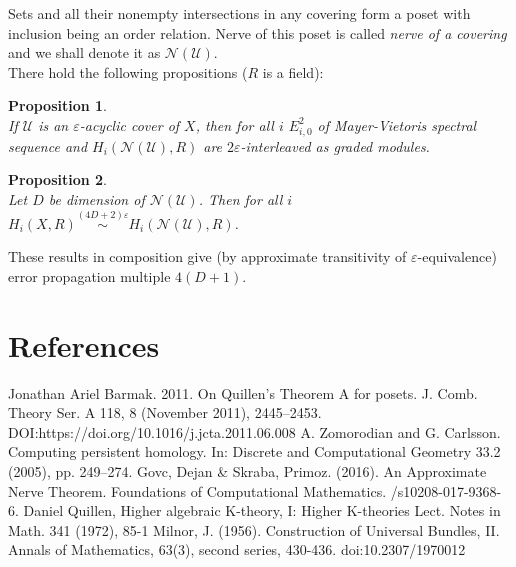 \documentclass[a4paper, 12pt]{article}
\newtheorem{proposition}{Proposition}
\theoremstyle{definition}
\theoremstyle{remark}
\newcommand{\define}[1]{{\textit{#1}}}
\begin{document}
Sets and all their nonempty intersections in any covering form a poset with inclusion being an order relation. Nerve of this poset is called \define{nerve of a covering} and we shall denote it as $\mathcal{N}(\mathcal{U})$.\\

There hold the following propositions ($R$ is a field):

\begin{proposition} {\cite[Corollary 5.2]{GS16}}\\
  If $\mathcal{U}$ is an $\varepsilon$-acyclic cover of $X$, then for all $i$ $E^2_{i,0}$ of Mayer-Vietoris spectral sequence and $H_{i}(\mathcal{N}(\mathcal{U}),R)$ are $2\varepsilon$-interleaved as graded modules.
\end{proposition}

\begin{proposition} {\cite[Theorem 7.1]{GS16}}\\
  Let $D$ be dimension of $\mathcal{N}(\mathcal{U})$. Then for all $i$ $H_i(X,R) \stackrel{(4D+2)\varepsilon}{\sim} H_i(\mathcal{N}(\mathcal{U}),R)$.
\end{proposition}

These results in composition give (by approximate transitivity of $\varepsilon$-equivalence) error propagation multiple $4(D+1)$.

\section{References}

\begin{enumerate}
  Jonathan Ariel Barmak. 2011.
  \newblock On Quillen’s Theorem A for posets.
  \newblock J. Comb. Theory Ser. A 118, 8 (November 2011), 2445–2453.
  \newblock DOI:https://doi.org/10.1016/j.jcta.2011.06.008
  A. Zomorodian and G. Carlsson.
  \newblock Computing persistent homology.
  \newblock In: Discrete and Computational Geometry 33.2 (2005), pp. 249–274.
  Govc, Dejan \& Skraba, Primoz. (2016).
  \newblock An Approximate Nerve Theorem.
  \newblock Foundations of Computational Mathematics.
  /s10208-017-9368-6.
  Daniel Quillen,
  \newblock Higher algebraic K-theory, I: Higher K-theories Lect.
  \newblock Notes in Math. 341 (1972), 85-1
  Milnor, J. (1956).
  \newblock Construction of Universal Bundles, II.
  \newblock Annals of Mathematics, 63(3), second series, 430-436.
  \newblock doi:10.2307/1970012
\end{enumerate}
\end{document}
